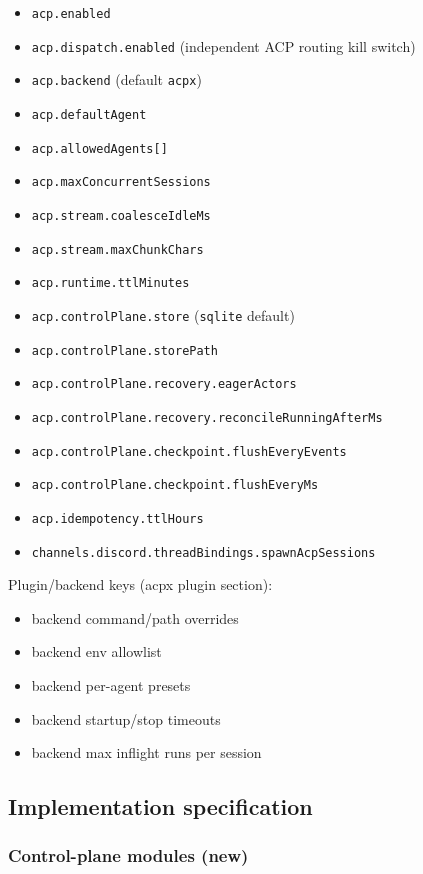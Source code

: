 \begin{itemize}
  \item \texttt{acp.enabled}
  \item \texttt{acp.dispatch.enabled} (independent ACP routing kill switch)
  \item \texttt{acp.backend} (default \texttt{acpx})
  \item \texttt{acp.defaultAgent}
  \item \texttt{acp.allowedAgents[]}
  \item \texttt{acp.maxConcurrentSessions}
  \item \texttt{acp.stream.coalesceIdleMs}
  \item \texttt{acp.stream.maxChunkChars}
  \item \texttt{acp.runtime.ttlMinutes}
  \item \texttt{acp.controlPlane.store} (\texttt{sqlite} default)
  \item \texttt{acp.controlPlane.storePath}
  \item \texttt{acp.controlPlane.recovery.eagerActors}
  \item \texttt{acp.controlPlane.recovery.reconcileRunningAfterMs}
  \item \texttt{acp.controlPlane.checkpoint.flushEveryEvents}
  \item \texttt{acp.controlPlane.checkpoint.flushEveryMs}
  \item \texttt{acp.idempotency.ttlHours}
  \item \texttt{channels.discord.threadBindings.spawnAcpSessions}
\end{itemize}


Plugin/backend keys (acpx plugin section):

\begin{itemize}
  \item backend command/path overrides
  \item backend env allowlist
  \item backend per-agent presets
  \item backend startup/stop timeouts
  \item backend max inflight runs per session
\end{itemize}


\subsection{Implementation specification}


\subsubsection{Control-plane modules (new)}


